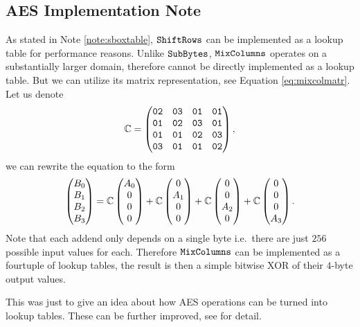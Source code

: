 \subsection{AES Implementation Note}
\label{sec:aeslookup}

As stated in Note \ref{note:sboxtable}, $\texttt{ShiftRows}$ can be implemented as a lookup table for performance reasons. Unlike $\texttt{SubBytes}$, $\texttt{MixColumns}$ operates on a substantially larger domain, therefore cannot be directly implemented as a lookup table. But we can utilize its matrix representation, see Equation \ref{eq:mixcolmatr}. Let us denote
\[
	\mathbb{C} =
	\begin{pmatrix}
		\texttt{02} & \texttt{03} & \texttt{01} & \texttt{01} \\
		\texttt{01} & \texttt{02} & \texttt{03} & \texttt{01} \\
		\texttt{01} & \texttt{01} & \texttt{02} & \texttt{03} \\
		\texttt{03} & \texttt{01} & \texttt{01} & \texttt{02}
	\end{pmatrix} ,
\]
we can rewrite the equation to the form
\[
	\begin{pmatrix}
			B_0 \\ B_1 \\ B_2 \\ B_3
		\end{pmatrix}
		=
		\mathbb{C}
		\begin{pmatrix}
			A_0 \\ 0 \\ 0 \\ 0
		\end{pmatrix}
		+
		\mathbb{C}
		\begin{pmatrix}
			0 \\ A_1 \\ 0 \\ 0
		\end{pmatrix}
		+
		\mathbb{C}
		\begin{pmatrix}
			0 \\ 0 \\ A_2 \\ 0
		\end{pmatrix}
		+
		\mathbb{C}
		\begin{pmatrix}
			0 \\ 0 \\ 0 \\ A_3
		\end{pmatrix}.
\]
Note that each addend only depends on a single byte i.e.\ there are just $256$ possible input values for each. Therefore $\texttt{MixColumns}$ can be implemented as a fourtuple of lookup tables, the result is then a simple bitwise XOR of their $4$-byte output values.

This was just to give an idea about how AES operations can be turned into lookup tables. These can be further improved, see \cite[Chapter~4]{daemen2013rijndael} for detail.
